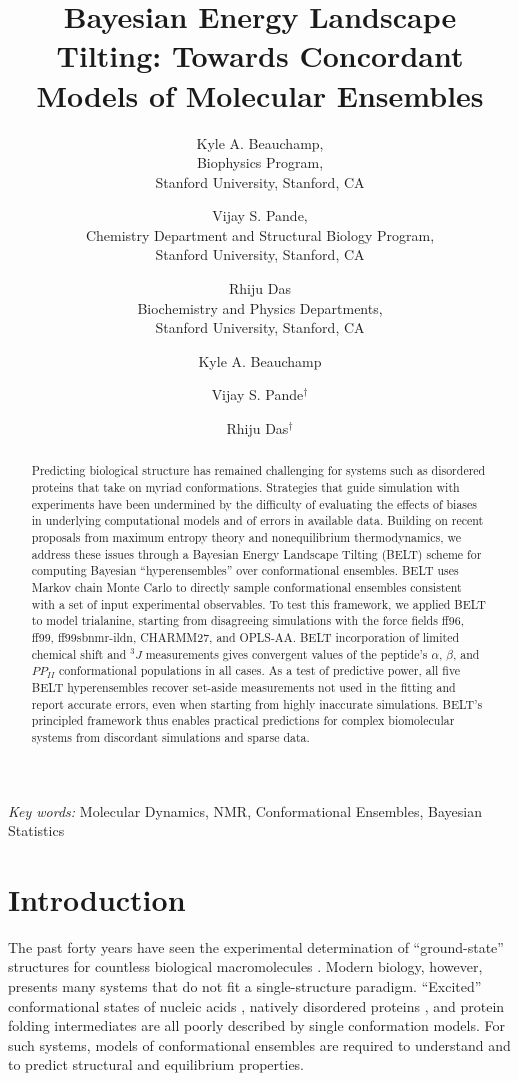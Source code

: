 \documentclass[journal=jacsat,manuscript=article]{achemso}
\author{Kyle A. Beauchamp, \\
Biophysics Program, \\
Stanford University, Stanford, CA
\and Vijay S. Pande, \\
Chemistry Department and Structural Biology Program, \\
Stanford University, Stanford, CA
\and Rhiju Das \\
Biochemistry and Physics Departments, \\
Stanford University, Stanford, CA
}
\author{Kyle A. Beauchamp}
\affiliation[Biophysics Program]{Biophysics Program}
\author{Vijay S. Pande$^\dagger$}
\affiliation[Chemistry Department]{Chemistry Department, Stanford University, Stanford, CA}
\author{Rhiju Das$^\dagger$}
\affiliation[Biochemistry Department]{Biochemistry Department, Stanford University, Stanford, CA}
\title{Bayesian Energy Landscape Tilting: Towards Concordant Models of Molecular Ensembles}
\begin{document}
\maketitle

\begin{abstract}

Predicting biological structure has remained challenging for systems such as disordered proteins that take on myriad conformations. Strategies that guide simulation with experiments have been undermined by the difficulty of evaluating the effects of biases in underlying computational models and of errors in available data. Building on recent proposals from maximum entropy theory and nonequilibrium thermodynamics, we address these issues through a Bayesian Energy Landscape Tilting (BELT) scheme for computing Bayesian \enquote{hyperensembles} over conformational ensembles.  BELT uses Markov chain Monte Carlo to directly sample conformational ensembles consistent with a set of input experimental observables.  To test this framework, we applied BELT to model trialanine, starting from disagreeing simulations with the force fields ff96, ff99, ff99sbnmr-ildn, CHARMM27, and OPLS-AA. BELT incorporation of limited chemical shift and $^3J$ measurements gives convergent values of the peptide's $\alpha$, $\beta$, and $PP_{II}$ conformational populations in all cases. As a test of predictive power, all five BELT hyperensembles recover set-aside 
measurements not used in the fitting and report accurate errors, even when starting from highly inaccurate simulations. BELT's principled framework thus enables practical predictions for complex biomolecular systems from discordant simulations and sparse data.   

\end{abstract}

\emph{Key words:} Molecular Dynamics, NMR, Conformational Ensembles,  Bayesian Statistics

\section*{Introduction}

The past forty years have seen the experimental determination of ``ground-state'' structures for countless biological macromolecules \cite{Berman2000}. Modern biology, however, presents many systems that do not fit a single-structure paradigm.  ``Excited'' conformational states of nucleic acids \cite{dethoff2012}, natively disordered proteins \cite{fink2005}, and protein folding intermediates \cite{korzhnev2004} are all poorly described by single conformation models.  For such systems, models of conformational ensembles are required to understand and to predict structural and equilibrium properties.  
\end{document}

